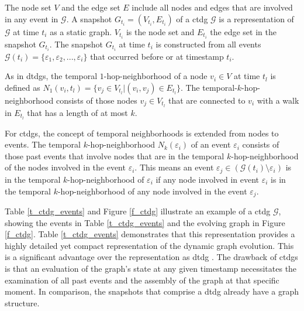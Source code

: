 The node set $V$ and the edge set $E$ include all nodes and edges that are involved in any event in $\mathcal{G}$. A snapshot $G_{t_i} = (V_{t_i}, E_{t_i})$ of a \gls{ctdg} $\mathcal{G}$ is a representation of $\mathcal{G}$ at time $t_i$ as a static graph. $V_{t_i}$ is the node set and $E_{t_i}$ the edge set in the snapshot $G_{t_i}$. The snapshot $G_{t_i}$ at time $t_i$ is constructed from all events $\mathcal{G}(t_i) = \{\varepsilon_1, \varepsilon_2, ..., \varepsilon_i\}$ that occurred before or at timestamp $t_i$.


As in \glspl{dtdg}, the temporal $1$-hop-neighborhood of a node $v_i \in V$ at time $t_l$ is defined as $N_1(v_i, t_l) = \{v_j \in V_{t_l} | (v_i, v_j) \in E_{t_l}\}$. The temporal-$k$-hop-neighborhood consists of those nodes $v_j \in V_{t_l}$ that are connected to $v_i$ with a walk in $E_{t_l}$ that has a length of at most $k$.


For \glspl{ctdg}, the concept of temporal neighborhoods is extended from nodes to events. The temporal $k$-hop-neighborhood $N_k(\varepsilon_i)$ of an event $\varepsilon_{i}$ consists of those past events that involve nodes that are in the temporal $k$-hop-neighborhood of the nodes involved in the event $\varepsilon_{i}$. This means an event $\varepsilon_{j} \in (\mathcal{G}(t_i) \setminus \varepsilon_{i})$ is in the temporal $k$-hop-neighborhood of $\varepsilon_{i}$ if any node involved in event $\varepsilon_{i}$ is in the temporal $k$-hop-neighborhood of any node involved in the event $\varepsilon_{j}$.

\vspace{5mm}

Table \ref{t_ctdg_events} and Figure \ref{f_ctdg} illustrate an example of a \gls{ctdg} $\mathcal{G}$, showing the events in Table \ref{t_ctdg_events} and the evolving graph in Figure \ref{f_ctdg}. Table \ref{t_ctdg_events} demonstrates that this representation provides a highly detailed yet compact representation of the dynamic graph evolution. This is a significant advantage over the representation as \gls{dtdg} \cite{trivedi_dyrep_2019}. The drawback of \glspl{ctdg} is that an evaluation of the graph's state at any given timestamp necessitates the examination of all past events and the assembly of the graph at that specific moment. In comparison, the snapshots that comprise a \gls{dtdg} already have a graph structure.

